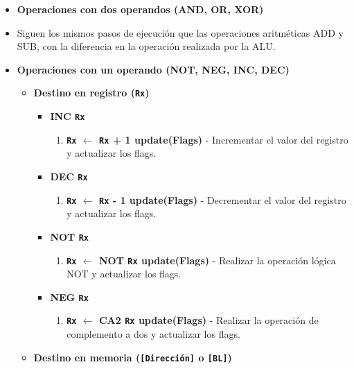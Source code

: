 \documentclass[12pt,oneside]{templates/unerthesis}
\providecommand{\tightlist}{%
  \setlength{\itemsep}{0pt}\setlength{\parskip}{0pt}}
\begin{document}
\begin{itemize}
  \begin{itemize}
  \item
    \textbf{Operaciones con dos operandos (AND, OR, XOR)}
  \item
    Siguen los mismos pasos de ejecución que las operaciones aritméticas ADD y SUB, con la diferencia en la operación realizada por la ALU.
  \item
    \textbf{Operaciones con un operando (NOT, NEG, INC, DEC)}

    \begin{itemize}
    \tightlist
    \item
      \textbf{Destino en registro (\texttt{Rx})}

      \begin{itemize}
      \tightlist
      \item
        \textbf{INC \texttt{Rx}}

        \begin{enumerate}
        \def\labelenumi{\arabic{enumi}.}
        \setcounter{enumi}{3}
        \tightlist
        \item
          \textbf{\texttt{Rx} \(\leftarrow\) \texttt{Rx} + 1 \textbar{} update(Flags)} - Incrementar el valor del registro y actualizar los flags.
        \end{enumerate}
      \item
        \textbf{DEC \texttt{Rx}}

        \begin{enumerate}
        \def\labelenumi{\arabic{enumi}.}
        \setcounter{enumi}{3}
        \tightlist
        \item
          \textbf{\texttt{Rx} \(\leftarrow\) \texttt{Rx} - 1 \textbar{} update(Flags)} - Decrementar el valor del registro y actualizar los flags.
        \end{enumerate}
      \item
        \textbf{NOT \texttt{Rx}}

        \begin{enumerate}
        \def\labelenumi{\arabic{enumi}.}
        \setcounter{enumi}{3}
        \tightlist
        \item
          \textbf{\texttt{Rx} \(\leftarrow\) NOT \texttt{Rx} \textbar{} update(Flags)} - Realizar la operación lógica NOT y actualizar los flags.
        \end{enumerate}
      \item
        \textbf{NEG \texttt{Rx}}

        \begin{enumerate}
        \def\labelenumi{\arabic{enumi}.}
        \setcounter{enumi}{3}
        \tightlist
        \item
          \textbf{\texttt{Rx} \(\leftarrow\) CA2 \texttt{Rx} \textbar{} update(Flags)} - Realizar la operación de complemento a dos y actualizar los flags.
        \end{enumerate}
      \end{itemize}
    \item
      \textbf{Destino en memoria (\texttt{{[}Dirección{]}} o \texttt{{[}BL{]}})}


\end{itemize}
\end{itemize}
\end{itemize}
\end{document}
